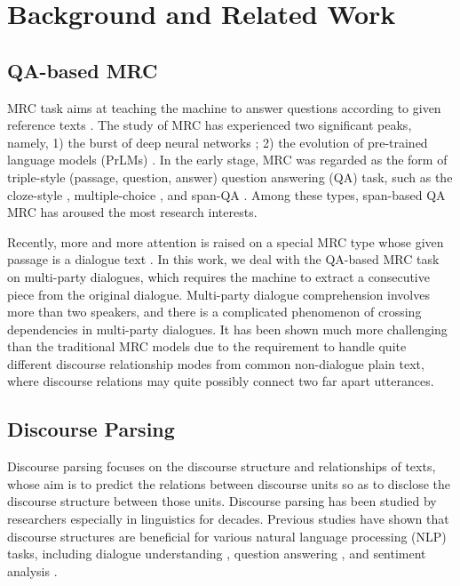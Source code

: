 \documentclass[11pt]{article}
\begin{document}
\section{Background and Related Work}\label{sec:related work}

\subsection{QA-based MRC}\label{subsec:MRC DP}
MRC task aims at teaching the machine to answer questions according to given reference texts \cite{hermann2015teaching,rajpurkar2016squad,zhang2020machine}. The study of MRC has experienced two significant peaks, namely, 1) the burst of deep neural networks \cite{wei2018fast,seo2018bidirectional}; 2) the evolution of pre-trained language models (PrLMs) \cite{devlin-etal-2019-bert,Clark2020ELECTRA:}. In the early stage, MRC was regarded as the form of triple-style (passage, question, answer) question answering (QA) task, such as the cloze-style \cite{hermann2015teaching,hill2015goldilocks}, multiple-choice \cite{lai2017race,sun2019dream}, and span-QA \cite{rajpurkar2016squad,Rajpurkar2018Know}. Among these types, span-based QA MRC has aroused the most research interests. 

Recently, more and more attention is raised on a special MRC type whose given passage is a dialogue text \cite{reddy2019coqa,choi2018quac}. In this work, we deal with the QA-based MRC task on multi-party dialogues, which requires the machine to extract a consecutive piece from the original dialogue. Multi-party dialogue comprehension involves more than two speakers, and there is a complicated phenomenon of crossing dependencies in multi-party dialogues. It has been shown much more challenging than the traditional MRC models \cite{li-etal-2020-molweni} due to the requirement to handle quite different discourse relationship modes from common non-dialogue plain text, where discourse relations may quite possibly connect two far apart utterances.







\subsection{Discourse Parsing}
Discourse parsing focuses on the discourse structure and relationships of texts, whose aim is to predict the relations between discourse units so as to disclose the discourse structure between those units. Discourse parsing has been studied by researchers especially in linguistics for decades. Previous studies have shown that discourse structures are beneficial for various natural language processing (NLP) tasks, including dialogue understanding \cite{asher2016discourse,takanobu2018weakly,gao-etal-2020-discern,jia2020multi}, question answering \cite{chai2004discourse,verberne2007evaluating,mihaylov2019discourse}, and sentiment analysis \cite{cambria2013new,nejat2017exploring}.
\end{document}
